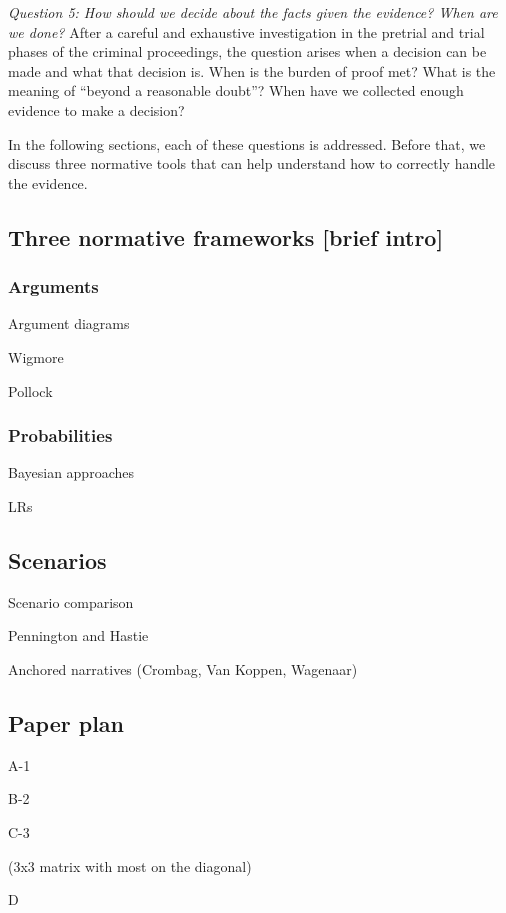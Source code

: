 \documentclass[10pt]{article}
\begin{document}
\textit{Question 5:	How should we decide about the facts given the evidence? When are we done?}
After a careful and exhaustive investigation in the pretrial and trial phases of the criminal proceedings, the question arises when a decision can be made and what that decision is. When is the burden of proof met? What is the meaning of ``beyond a reasonable doubt''? When have we collected enough evidence to make a decision?

In the following sections, each of these questions is addressed. Before that, we discuss three normative tools that can help understand how to correctly handle the evidence.

\subsection{Three normative frameworks [brief intro]}

\subsubsection{Arguments}

			Argument diagrams

			Wigmore

			Pollock

\subsubsection{Probabilities}

			Bayesian approaches

			LRs

\subsection{Scenarios}

			Scenario comparison

			Pennington and Hastie

			Anchored narratives (Crombag, Van Koppen, Wagenaar)
			
\subsection{Paper plan}


		A-1

		B-2

		C-3

			(3x3 matrix with most on the diagonal)

		D
\end{document}
